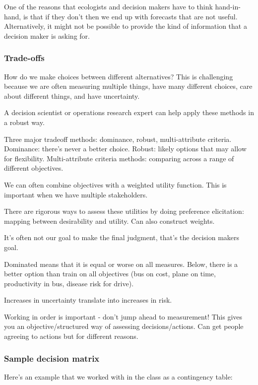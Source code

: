 \documentclass[12pt, oneside]{article}   	%
\begin{document}
One of the reasons that ecologists and decision makers have to think hand-in-hand, is that if they don't then we end up with forecasts that are not useful. Alternatively, it might not be possible to provide the kind of information that a decision maker is asking for.

\subsubsection{Trade-offs}

How do we make choices between different alternatives? This is challenging because we are often measuring multiple things, have many different choices, care about different things, and have uncertainty. 

A decision scientist or operations research expert can help apply these methods in a robust way.

Three major tradeoff methods: dominance, robust, multi-attribute criteria. Dominance: there's never a better choice. Robust: likely options that may allow for flexibility. Multi-attribute criteria methods: comparing across a range of different objectives.

We can often combine objectives with a weighted utility function. This is important when we have multiple stakeholders.

There are rigorous ways to assess these utilities by doing preference elicitation: mapping between desirability and utility. Can also construct weights.

It's often not our goal to make the final judgment, that's the decision makers goal.

Dominated means that it is equal or worse on all measures. Below, there is a better option than train on all objectives (bus on cost, plane on time, productivity in bus, disease risk for drive).

Increases in uncertainty translate into increases in risk.

Working in order is important - don't jump ahead to measurement! This gives you an objective/structured way of assessing decisions/actions. Can get people agreeing to actions but for different reasons.

\subsubsection{Sample decision matrix}

Here's an example that we worked with in the class as a contingency table:
\end{document}
